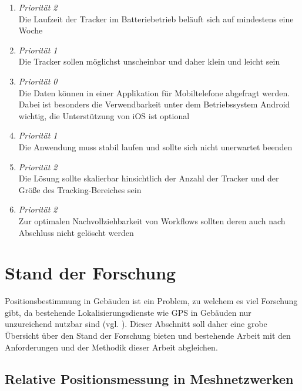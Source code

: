\dotfill

\begin{enumerate}[label=\textbf{NF-\arabic*}]
	\item \label{nf:akku} \textit{Priorität 2}  \\
		Die Laufzeit der Tracker im Batteriebetrieb beläuft sich auf mindestens eine Woche
	\item \label{nf:klein} \textit{Priorität 1}  \\
		Die Tracker sollen möglichst unscheinbar und daher klein und leicht sein
	\item \label{nf:app} \textit{Priorität 0}\\
		Die Daten können in einer Applikation für Mobiltelefone abgefragt werden.  Dabei ist besonders
		die Verwendbarkeit unter dem Betriebssystem Android wichtig, die Unterstützung von iOS ist
		optional
	\item \label{nf:stabilität} \textit{Priorität 1}\\
		Die Anwendung muss stabil laufen und sollte sich nicht unerwartet beenden
	\item \label{nf:skalierbarkeit} \textit{Priorität 2}\\
		Die Lösung sollte skalierbar hinsichtlich der Anzahl der Tracker und der Größe des
		Tracking-Bereiches sein
	\item \label{nf:nachvollziehbarkeit} \textit{Priorität 2}\\
		Zur optimalen Nachvollziehbarkeit von Workflows sollten deren auch nach Abschluss nicht gelöscht
		werden
\end{enumerate}

\section{Stand der Forschung} \label{sec:stand-der-forschung}

Positionsbestimmung in Gebäuden ist ein Problem, zu welchem es viel Forschung gibt, da bestehende
Lokalisierungsdienste wie \gls{GPS} in Gebäuden nur unzureichend nutzbar sind (vgl. \cite{Liu}). Dieser Abschnitt soll
daher eine grobe Übersicht über den Stand der Forschung bieten und bestehende Arbeit mit den
Anforderungen und der Methodik dieser Arbeit abgleichen.

\subsection{Relative Positionsmessung in Meshnetzwerken}

